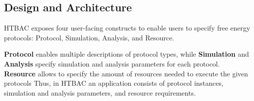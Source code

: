 



\subsection{Design and Architecture}\label{ssec:design_arch}

HTBAC exposes four user-facing constructs to enable users to specify free
energy protocols: Protocol, Simulation, Analysis, and Resource.



\textbf{Protocol} enables multiple descriptions of protocol types, while
\textbf{Simulation} and \textbf{Analysis} specify simulation and analysis
parameters for each protocol. \textbf{Resource} allows to specify the amount
of resources needed to execute the given protocols 
Thus, in HTBAC an application consists of protocol instances, simulation and
analysis parameters, and resource requirements.

